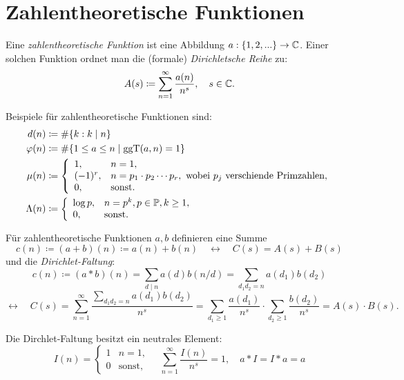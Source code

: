 \chapter{Zahlentheoretische Funktionen}

\begin{definition}
    Eine \emph{zahlentheoretische Funktion} ist eine Abbildung $a : \{1,2,...\} \to \mathbb{C}$. Einer solchen Funktion ordnet man die (formale) \emph{Dirichletsche Reihe} zu:
    $$ A(s) \coloneqq \sum_{n=1}^\infty \frac{a(n)}{n^s}, \quad s \in \mathbb{C}. $$
\end{definition}

\begin{example}
    Beispiele für zahlentheoretische Funktionen sind:
    \begin{align*}
        d(n) &\coloneqq \# \{ k : k \mid n \} \\
        \varphi(n) &\coloneqq \# \{ 1 \leq a \leq n \mid \operatorname*{ggT}(a, n) = 1 \} \\
        \mu(n) &\coloneqq \left\{ \begin{array}{ll}
            1, & n = 1, \\
            (-1)^r, & n = p_1 \cdot p_2 \cdots p_r, \textrm{ wobei $p_j$ verschiende Primzahlen}, \\
            0, & \textrm{sonst}.
        \end{array} \right. \\
        \Lambda(n) &\coloneqq \left\{ \begin{array}{ll}
            \log p, & n = p^k, p \in \mathbb{P}, k \geq 1, \\
            0, & \textrm{sonst}.
        \end{array} \right.
    \end{align*}
\end{example}

\begin{definition}
    Für zahlentheoretische Funktionen $a, b$ definieren eine Summe
    $$ c(n) \coloneqq (a+b)(n) \coloneqq a(n) + b(n) \quad \leftrightarrow \quad C(s) = A(s) + B(s) $$
    und die \emph{Dirichlet-Faltung}:
    $$ c(n) \coloneqq (a \ast b)(n) = \sum_{d \mid n} a(d) b(n/d) = \sum_{d_1 d_2 = n} a(d_1) b(d_2) $$
    $$ \leftrightarrow \quad C(s) = \sum_{n=1}^\infty \frac{\sum_{d_1 d_2 = n} a(d_1) b(d_2)}{n^s} = \sum_{d_1 \geq 1} \frac{a(d_1)}{n^s} \cdot \sum_{d_2 \geq 1} \frac{b(d_2)}{n^s} = A(s) \cdot B(s). $$
\end{definition}

\begin{example}
    Die Dirchlet-Faltung besitzt ein neutrales Element:
    $$ I(n) = \left\{ \begin{array}{ll}
        1 & n = 1, \\
        0 & \textrm{sonst},
    \end{array} \right.
    \quad \sum_{n=1}^\infty \frac{I(n)}{n^s} = 1,
    \quad a \ast I = I \ast a = a $$
\end{example}

